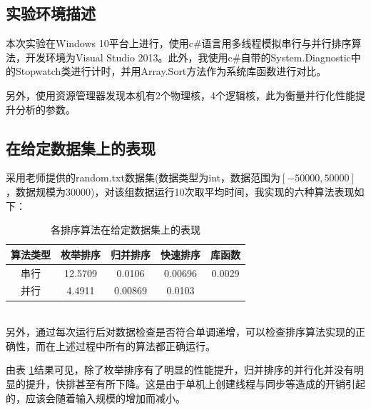 \documentclass[UTF8]{article}
\begin{document}
\subsection{实验环境描述}
本次实验在Windows 10平台上进行，使用c\#语言用多线程模拟串行与并行排序算法，开发环境为Visual Studio 2013。此外，我使用c\#自带的System.Diagnostic中的Stopwatch类进行计时，并用Array.Sort方法作为系统库函数进行对比。
\par 另外，使用资源管理器发现本机有2个物理核，4个逻辑核，此为衡量并行化性能提升分析的参数。
\subsection{在给定数据集上的表现}
采用老师提供的random.txt数据集(数据类型为int，数据范围为$[-50000,50000]$，数据规模为30000)，对该组数据运行10次取平均时间，我实现的六种算法表现如下：\\
\begin{table}
\centering
\begin{tabular}{|c|c|c|c|c|}
	\hline
	算法类型 & 枚举排序 & 归并排序 & 快速排序 & 库函数 \\
	\hline
	串行 & 12.5709 & 0.0106 & 0.00696 & 0.0029\\
	\hline
	并行 & 4.4911  & 0.00869 & 0.0103 & {}\\ 
	\hline
\end{tabular}
\caption{各排序算法在给定数据集上的表现}
\label{size30000}
\end{table} 
\\
另外，通过每次运行后对数据检查是否符合单调递增，可以检查排序算法实现的正确性，而在上述过程中所有的算法都正确运行。
\par 由表 \ref{size30000}结果可见，除了枚举排序有了明显的性能提升，归并排序的并行化并没有明显的提升，快排甚至有所下降。这是由于单机上创建线程与同步等造成的开销引起的，应该会随着输入规模的增加而减小。
\end{document}
